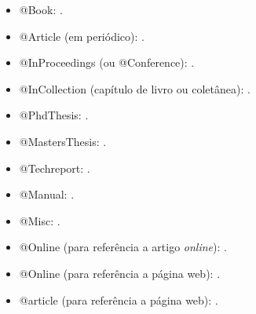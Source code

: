 \documentclass[portuguese,notblind]{sbc20}
\begin{document}
\begin{itemize}
  \item @Book: \cite{Knuth:96}.

  \item @Article (em periódico): \cite{floats2014}.

  \item @InProceedings (ou @Conference): \cite{alves03:simi}.

  \item @InCollection (capítulo de livro ou coletânea): \cite{bobaoglu93:concepts}.

  \item @PhdThesis: \cite{garcia01:PhD}.

  \item @MastersThesis: \cite{schmidt03:MSc}.

  \item @Techreport: \cite{alvisi99:analysisCIC}.

  \item @Manual: \cite{biblatex}.

  \item @Misc: \cite{gridftp}.

  \item @Online (para referência a artigo \emph{online}): \cite{fowler04:designDead}.

  \item @Online (para referência a página web): \cite{FSF:GNU-GPL}.

  \item @article (para referência a página web): \cite{alon09:how}.
  
\end{itemize}


\end{document}
